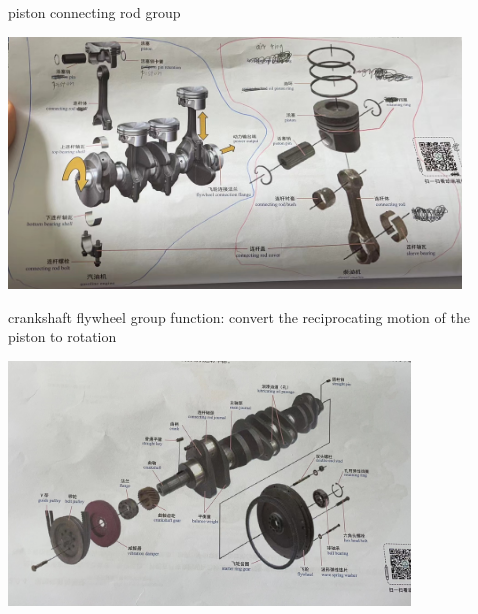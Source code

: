 \begin{frame}
	\begin{block}{piston connecting rod group}
		\begin{center}
			\includegraphics[width=0.9\textwidth]{2-14}
		\end{center}
	\end{block}
\end{frame}
\begin{frame}
	\begin{block}{crankshaft flywheel group}
		function: convert the reciprocating motion of the piston to rotation
		\begin{center}
			\includegraphics[width=0.8\textwidth]{2-15}
		\end{center}
	\end{block}
\end{frame}

